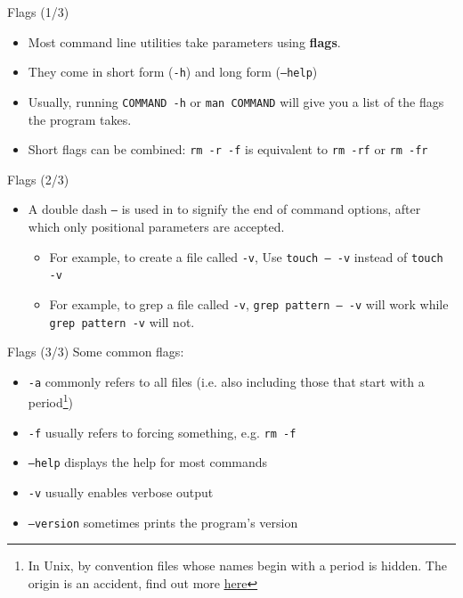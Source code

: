 \documentclass[12pt]{beamer}
\begin{document}
\begin{frame}[fragile]{Flags (1/3)}
  \begin{itemize}
    \item Most command line utilities take parameters using \textbf{flags}.
    \item They come in short form (\texttt{-h}) and long form (\texttt{--help})
    \item Usually, running \texttt{COMMAND -h} or \texttt{man COMMAND} will give you a list of the flags the program takes.
    \item Short flags can be combined: \texttt{rm -r -f} is equivalent to \texttt{rm -rf} or \texttt{rm -fr}
  \end{itemize}
\end{frame}

\begin{frame}[fragile]{Flags (2/3)}
  \begin{itemize}
    \item A double dash \texttt{--} is used in to signify the end of command options, after which only positional parameters are accepted.
          \begin{itemize}
            \item For example, to create a file called \texttt{-v}, Use \texttt{touch -- -v} instead of \texttt{touch -v}
            \item For example, to grep a file called \texttt{-v}, \texttt{grep pattern -- -v} will work while \texttt{grep pattern -v} will not.
          \end{itemize}
  \end{itemize}
\end{frame}

\begin{frame}[fragile]{Flags (3/3)}
  Some common flags:
  \begin{itemize}
    \item \texttt{-a} commonly refers to all files (i.e. also including those that start with a period\footnote{In Unix, by convention files whose names begin with a period is hidden. The origin is an accident, find out more \href{https://web.archive.org/web/20150310215704if_/https://plus.google.com/+RobPikeTheHuman/posts/R58WgWwN9jp}{\underline{here}}})
    \item \texttt{-f} usually refers to forcing something, e.g. \texttt{rm -f}
    \item \texttt{--help} displays the help for most commands
    \item \texttt{-v} usually enables verbose output
    \item \texttt{--version} sometimes prints the program's version
  \end{itemize}
\end{frame}
\end{document}
